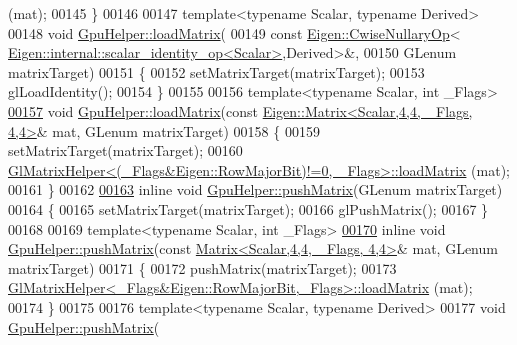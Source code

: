 \begin{DoxyCode}
      (mat);
00145 \}
00146 
00147 \textcolor{keyword}{template}<\textcolor{keyword}{typename} Scalar, \textcolor{keyword}{typename} Derived>
00148 \textcolor{keywordtype}{void} \hyperlink{class_gpu_helper_a31ac77373dc54409648558d79d5a8c3e}{GpuHelper::loadMatrix}(
00149     \textcolor{keyword}{const} \hyperlink{group___core___module_class_eigen_1_1_cwise_nullary_op}{Eigen::CwiseNullaryOp}<
      \hyperlink{struct_eigen_1_1internal_1_1scalar__identity__op}{Eigen::internal::scalar\_identity\_op<Scalar>},Derived>&,
00150     GLenum matrixTarget)
00151 \{
00152     setMatrixTarget(matrixTarget);
00153     glLoadIdentity();
00154 \}
00155 
00156 \textcolor{keyword}{template}<\textcolor{keyword}{typename} Scalar, \textcolor{keywordtype}{int} \_Flags>
\hyperlink{class_gpu_helper_a31ac77373dc54409648558d79d5a8c3e}{00157} \textcolor{keywordtype}{void} \hyperlink{class_gpu_helper_a31ac77373dc54409648558d79d5a8c3e}{GpuHelper::loadMatrix}(\textcolor{keyword}{const} 
      \hyperlink{group___core___module_class_eigen_1_1_matrix}{Eigen::Matrix<Scalar,4,4, \_Flags, 4,4>}& mat, GLenum matrixTarget)
00158 \{
00159     setMatrixTarget(matrixTarget);
00160     \hyperlink{struct_gl_matrix_helper}{GlMatrixHelper<(\_Flags&Eigen::RowMajorBit)!=0, \_Flags>::loadMatrix}
      (mat);
00161 \}
00162 
\hyperlink{class_gpu_helper_a515a9248689ca95d90a1919b2e6973ec}{00163} \textcolor{keyword}{inline} \textcolor{keywordtype}{void} \hyperlink{class_gpu_helper_ac51c8b669a80ca6e4338c87136fb991e}{GpuHelper::pushMatrix}(GLenum matrixTarget)
00164 \{
00165     setMatrixTarget(matrixTarget);
00166     glPushMatrix();
00167 \}
00168 
00169 \textcolor{keyword}{template}<\textcolor{keyword}{typename} Scalar, \textcolor{keywordtype}{int} \_Flags>
\hyperlink{class_gpu_helper_ac51c8b669a80ca6e4338c87136fb991e}{00170} \textcolor{keyword}{inline} \textcolor{keywordtype}{void} \hyperlink{class_gpu_helper_ac51c8b669a80ca6e4338c87136fb991e}{GpuHelper::pushMatrix}(\textcolor{keyword}{const} 
      \hyperlink{group___core___module_class_eigen_1_1_matrix}{Matrix<Scalar,4,4, \_Flags, 4,4>}& mat, GLenum matrixTarget)
00171 \{
00172     pushMatrix(matrixTarget);
00173     \hyperlink{struct_gl_matrix_helper}{GlMatrixHelper<\_Flags&Eigen::RowMajorBit,\_Flags>::loadMatrix}
      (mat);
00174 \}
00175 
00176 \textcolor{keyword}{template}<\textcolor{keyword}{typename} Scalar, \textcolor{keyword}{typename} Derived>
00177 \textcolor{keywordtype}{void} \hyperlink{class_gpu_helper_ac51c8b669a80ca6e4338c87136fb991e}{GpuHelper::pushMatrix}(

\end{DoxyCode}
